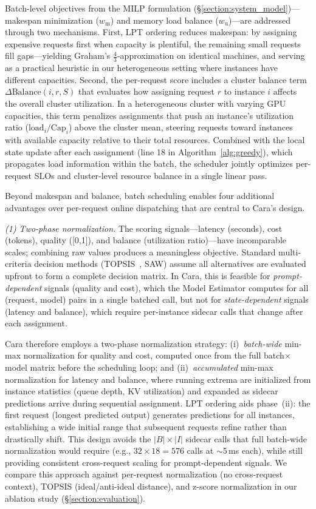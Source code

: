 \documentclass[letterpaper, anonymous, twocolumn, 10pt]{article}
\begin{document}
Batch-level objectives from the MILP formulation (\S\ref{section:system_model})---makespan minimization ($w_{\text{m}}$) and memory load balance ($w_{\text{u}}$)---are addressed through two mechanisms.
First, LPT ordering reduces makespan: by assigning expensive requests first when capacity is plentiful, the remaining small requests fill gaps---yielding Graham's $\frac{4}{3}$-approximation on identical machines, and serving as a practical heuristic in our heterogeneous setting where instances have different capacities.
Second, the per-request score includes a cluster balance term $\Delta\text{Balance}(i, r, S)$ that evaluates how assigning request $r$ to instance $i$ affects the overall cluster utilization.
In a heterogeneous cluster with varying GPU capacities, this term penalizes assignments that push an instance's utilization ratio ($\text{load}_i / \text{Cap}_i$) above the cluster mean, steering requests toward instances with available capacity relative to their total resources.
Combined with the local state update after each assignment (line 18 in Algorithm~\ref{alg:greedy}), which propagates load information within the batch, the scheduler jointly optimizes per-request SLOs and cluster-level resource balance in a single linear pass.

Beyond makespan and balance, batch scheduling enables four additional advantages over per-request online dispatching that are central to Cara's design.

\emph{(1) Two-phase normalization.}
The scoring signals---latency (seconds), cost (tokens), quality ([0,1]), and balance (utilization ratio)---have incomparable scales; combining raw values produces a meaningless objective.
Standard multi-criteria decision methods (TOPSIS~\cite{hwang1981topsis}, SAW) assume all alternatives are evaluated upfront to form a complete decision matrix.
In Cara, this is feasible for \emph{prompt-dependent} signals (quality and cost), which the Model Estimator computes for all (request, model) pairs in a single batched call, but not for \emph{state-dependent} signals (latency and balance), which require per-instance sidecar calls that change after each assignment.

Cara therefore employs a two-phase normalization strategy:
(i)~\emph{batch-wide} min-max normalization for quality and cost, computed once from the full batch$\times$model matrix before the scheduling loop; and
(ii)~\emph{accumulated} min-max normalization for latency and balance, where running extrema are initialized from instance statistics (queue depth, KV utilization) and expanded as sidecar predictions arrive during sequential assignment.
LPT ordering aids phase~(ii): the first request (longest predicted output) generates predictions for all instances, establishing a wide initial range that subsequent requests refine rather than drastically shift.
This design avoids the $|B| \times |I|$ sidecar calls that full batch-wide normalization would require (e.g., $32 \times 18 = 576$ calls at $\sim$5\,ms each), while still providing consistent cross-request scaling for prompt-dependent signals.
We compare this approach against per-request normalization (no cross-request context), TOPSIS (ideal/anti-ideal distance), and z-score normalization in our ablation study (\S\ref{section:evaluation}).
\end{document}
